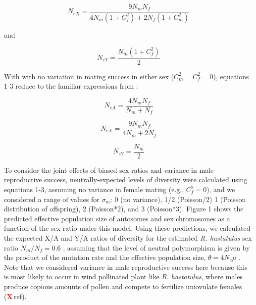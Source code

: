 \documentclass[9pt,twocolumn,twoside]{gsajnl}
\newcommand{\X}{\textcolor{red}{\bf X\,}}
\begin{document}
\begin{equation}
N_{e{X}} = \frac{9N_{m}N_{f}}{4N_{m}(1+C^2_{f})+2N_{f}(1+C^2_{m})}\label{eq:NeX}
\end{equation}

and

\begin{equation}
N_{e{Y}} = \frac{N_{m}(1+C^2_{f})}{2}\label{eq:NeY}
\end{equation}

With with no variation in mating success in either sex ($C^2_{m}=C^2_{f}=0$), equations 1-3 reduce to the familiar expressions from \citep{wright1931evolution}:

\begin{equation}
N_{e{A}} = \frac{4N_{m}N_{f}}{N_{m}+N_{f}}\label{eq:NeA}
\end{equation}


\begin{equation}
N_{e{X}} = \frac{9N_{m}N_{f}}{4N_{m}+2N_{f}}\label{eq:NeX}
\end{equation}

\begin{equation}
N_{e{Y}} = \frac{N_{m}}{2}\label{eq:NeY}
\end{equation}

To consider the joint effects of biased sex ratios and variance in male reproductive success, neutrally-expected levels of diversity were calculated using equations 1-3, assuming no variance in female mating (e.g., $C^2_{f}=0$), and we considered a range of values for $\sigma_{m}$: 0 (no variance), 1/2 (Poisson/2) 1 (Poisson distribution of offspring), 2 (Poisson*2), and 3 (Poisson*3). Figure 1 shows the predicted effective population size of autosomes and sex chromosomes as a function of the sex ratio under this model. Using these predictions, we calculated the expected X/A and Y/A ratios of diversity for the estimated \textit{R. hastatulus} sex ratio $N_{m}/N_{f}=0.6$ \citep{pickup2013influence}, assuming that the level of neutral polymorphism is given by the product of the mutation rate and the effective population size, $\theta=4N_{e}\mu$ \citep{watterson1975}. Note that we considered variance in male reproductive success here because this is most likely to occur in wind pollinated plant like \textit{R. hastatulus}, where males produce copious amounts of pollen and compete to fertilize uniovulate females (\X ref).
\end{document}
